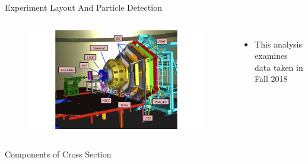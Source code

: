 \documentclass[aspectratio=169]{beamer}
\newcommand*{\myfont}{\fontfamily{lmtt}\selectfont}
\begin{document}
\begin{frame}{Experiment Layout And Particle Detection}
\begin{columns}[t, onlytextwidth]
                \vspace{0.3cm}
                \begin{figure}[t!]
                    \includegraphics[trim={8cm 1cm  8cm 1cm},width=.899\textwidth]{DNP/jlab_clas_layout_1.png}
                    

                    
                \end{figure}
                \begin{itemize}
                    \setlength\itemsep{.35em}
                    \item This analysis examines data taken in Fall 2018
                    \end{itemize}
                {\myfont{\tiny [V. Burkert et al., NIMA, 959, 163419 (2020)] }}
        \end{columns}
\end{frame}    


\begin{frame}{Components of Cross Section}

    
    \begin{figure}[h]
        \centering
    \end{figure}
\end{frame}
\end{document}
